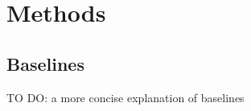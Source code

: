 \documentclass{article}
\begin{document}
\section{Methods}

\subsection{Baselines} \label{baselines}

TO DO: a more concise explanation of baselines





\end{document}

